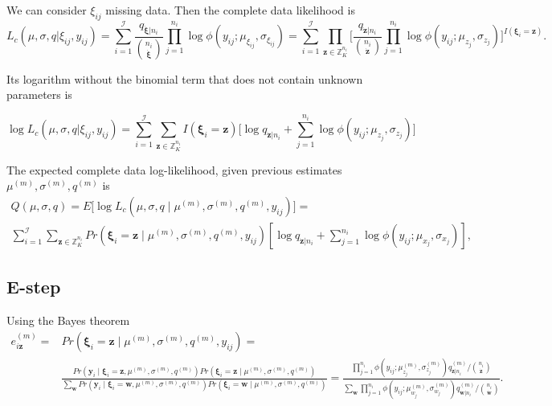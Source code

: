 \documentclass[reqno]{amsart}
\newcommand{\vv}[1]{\boldsymbol{#1}}
\newcommand{\ff}[1]{\dot{#1}}
\newcommand{\Z}[2][K]{\mathbb{Z}_{#1}^{#2}}
\newcommand{\I}{\mathcal{I}}
\begin{document}
We can consider $\xi_{ij}$ missing data. Then the complete data likelihood is
\begin{equation}
L_c(\mu, \sigma, q | \xi_{ij}, y_{ij}) = 
 \sum_{i=1}^\I  \frac{q_{\ff{\vv{\xi}}|n_i}}{\binom{n_i}{\ff{\vv{\xi}}}}  \prod_{j=1}^{n_i} \log \phi(y_{ij}; \mu_{\xi_{ij}}, \sigma_{\xi_{ij}}) =
 \sum_{i=1}^\I \prod_{\vv{z}\in\Z{n_i}} \big[\frac{q_{\ff{\vv{z}}|n_i}}{\binom{n_i}{\ff{\vv{z}}}} 
    \prod_{j=1}^{n_i} \log \phi(y_{ij}; \mu_{z_j}, \sigma_{z_j})\big]^{I(\vv{\xi}_i = \vv{z})}.
\end{equation}

Its logarithm without the binomial term that does not contain unknown parameters is

\begin{equation}
\log L_c(\mu, \sigma, q | \xi_{ij}, y_{ij}) = 
  \sum_{i=1}^\I \sum_{\vv{z}\in\Z{n_i}} I(\vv{\xi}_i = \vv{z}) \big[\log q_{\ff{\vv{z}}|n_i}  +  
        \sum_{j=1}^{n_i} \log \phi(y_{ij}; \mu_{z_j}, \sigma_{z_j})\big]
\end{equation}

The expected complete data log-likelihood, given previous estimates $\mu^{(m)}, \sigma^{(m)}, q^{(m)}$ is
\begin{multline}
Q(\mu, \sigma, q) = E\big[\log L_c(\mu, \sigma, q \mid \mu^{(m)}, \sigma^{(m)}, q^{(m)}, y_{ij})\big] = \\
 \sum_{i=1}^\I \sum_{\vv{z}\in\Z{n_i}}  Pr(\vv{\xi}_{i}=\vv{z} \mid \mu^{(m)}, \sigma^{(m)}, q^{(m)}, y_{ij} ) 
 [\log q_{\ff{\vv{z}}|n_i}  +\sum_{j=1}^{n_i}\log \phi(y_{ij}; \mu_{x_j}, \sigma_{x_j})],
\end{multline}

\subsection{E-step}
Using the Bayes theorem
\begin{align}
 e_{i\vv{z}}^{(m)} = & Pr(\vv{\xi}_{i}=\vv{z} \mid \mu^{(m)}, \sigma^{(m)}, q^{(m)}, y_{ij} )=\\
  & \frac{Pr(\vv{y}_{i} \mid \vv{\xi}_i=\vv{z},  \mu^{(m)}, \sigma^{(m)}, q^{(m)}) Pr(\vv{\xi}_{i}=\vv{z} \mid \mu^{(m)}, \sigma^{(m)}, q^{(m)})}%
  {\sum_{\vv{w}} Pr(\vv{y}_{i} \mid \vv{\xi}_i=\vv{w}, \mu^{(m)}, \sigma^{(m)}, q^{(m)}) Pr(\vv{\xi}_{i}=\vv{w} \mid \mu^{(m)}, \sigma^{(m)}, q^{(m)}) } = 
  \frac{\prod_{j=1}^{n_i} \phi(y_{ij}; \mu_{z_j}^{(m)}, \sigma^{(m)}_{z_j})  q^{(m)}_{\ff{\vv{z}}|n_i}\big/ {\binom{n_i}{\ff{\vv{z}}}} }%
  {\sum_{\vv{w}}\prod_{j=1}^{n_i} \phi(y_{ij}; \mu_{w_j}^{(m)}, \sigma^{(m)}_{w_j})  q^{(m)}_{\ff{\vv{w}}|n_i} \big/{\binom{n_i}{\ff{\vv{w}}}}   }.  
\end{align}
\end{document}
